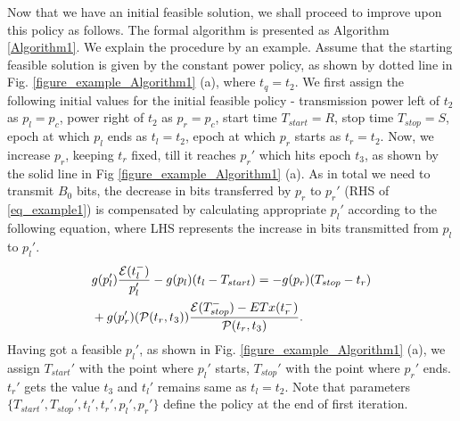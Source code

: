 %
%

Now that we have an initial feasible solution, we shall proceed to improve upon this policy as follows. The formal algorithm is presented as Algorithm \ref{Algorithm1}. We explain the procedure by an example. Assume that the starting feasible solution is given by the constant power policy, as shown by dotted line in Fig. \ref{figure_example_Algorithm1} (a), where $t_q=t_2$. We first assign the following initial values for the initial feasible policy - transmission power left of $t_2$ as $p_l=p_c$, power right of $t_2$ as $p_r=p_c$, start time $T_{start}=R$, stop time $T_{stop}=S$, epoch at which $p_l$ ends as $t_l=t_2$, epoch at which $p_r$ starts as $t_r=t_2$. Now, we increase $p_r$, keeping $t_r$ fixed, till it reaches $p_r'$ which hits epoch $t_3$, as shown by the solid line in Fig \ref{figure_example_Algorithm1} (a). As in total we need to transmit $B_0$ bits, the decrease in bits transferred by $p_r$ to $p_r'$ (RHS of \eqref{eq_example1}) is compensated by calculating appropriate $p_l'$ according to the following equation, where LHS represents the increase in bits transmitted from $p_l$ to $p_l'$.
\begin{align}
&g(p_l')\frac{\ETx(t_l^-)}{p_l'}-g(p_l)(t_l-T_{start})=-g(p_r)(T_{stop}-t_r)\nonumber\\
&+g(p_r')(\mathcal{P}(t_r,t_3))\frac{\ETx(T_{stop}^-)-ETx(t_r^-)}{\mathcal{P}(t_r,t_3)}.
\label{eq_example1}
\end{align}   
Having got a feasible $p_l'$, as shown in Fig. \ref{figure_example_Algorithm1} (a), we assign $T_{start}'$ with the point where $p_l'$ starts, $T_{stop}'$ with the point where $p_r'$ ends. $t_r'$ gets the value $t_3$ and $t_l'$ remains same as $t_l=t_2$. Note that parameters $\{T_{start}',T_{stop}',t_l',t_r',p_l',p_r'\}$ define the policy at the end of first iteration. 

